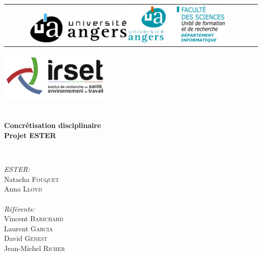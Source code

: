 
\begin{titlepage}
    \begin{center}
    
    
    \begin{tabular}{cc}
  \includegraphics[width=0.4\textwidth]{./img/ua_h_couleur}
  \hspace{4cm}
    \includegraphics[width=0.4\textwidth]{./img/Dpt_Info}
	\end{tabular}    
    
      \vspace{1cm}

	
	\includegraphics[width=0.4\textwidth]{./img/irset}~\\[1cm]

    
    \textsc{\Large }\\[0.5cm]
    
    \HRule \\[0.4cm]
    
    {\huge \bfseries Concrétisation disciplinaire\\
   Projet ESTER \\[0.4cm] }
    
    \HRule \\[1.5cm]
    
    \begin{minipage}{0.4\textwidth}
    \begin{flushleft} \large
    
     \emph{ESTER:}\\
    Natacha \textsc{Fouquet}\\
    Anna \textsc{Lloyd}\\
    \textsc{\Large }\\[0.3cm]
    \emph{Référents:}\\
    Vincent \textsc{Barichard}\\
    Laurent \textsc{Garcia}\\
    David \textsc{Genest}\\
    Jean-Michel \textsc{Richer}
    

\end{flushleft}
\end{minipage}
\end{center}
\end{titlepage}
